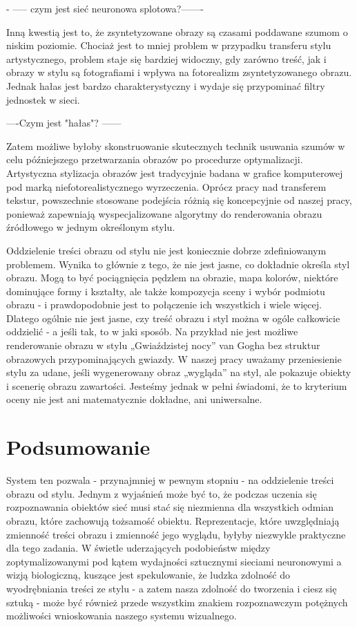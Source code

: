 \documentclass[brudnopis]{xmgr}
\begin{document}
- ----- czym jest sieć neuronowa splotowa?-------

Inną kwestią jest to, że zsyntetyzowane obrazy są czasami poddawane szumom o niskim poziomie. Chociaż jest to mniej problem w przypadku transferu stylu artystycznego, problem staje się bardziej widoczny, gdy zarówno treść, jak i obrazy w stylu są fotografiami i wpływa na fotorealizm zsyntetyzowanego obrazu. Jednak hałas jest bardzo charakterystyczny i wydaje się przypominać filtry jednostek w sieci. 

----Czym jest "hałas"? ------

Zatem możliwe byłoby skonstruowanie skutecznych technik usuwania szumów w celu późniejszego przetwarzania obrazów po procedurze optymalizacji.
Artystyczna stylizacja obrazów jest tradycyjnie badana w grafice komputerowej pod marką niefotorealistycznego wyrzeczenia. Oprócz pracy nad transferem tekstur, powszechnie stosowane podejścia różnią się koncepcyjnie od naszej pracy, ponieważ zapewniają wyspecjalizowane algorytmy do renderowania obrazu źródłowego w jednym określonym stylu. 

Oddzielenie treści obrazu od stylu nie jest koniecznie dobrze zdefiniowanym problemem. Wynika to głównie z tego, że nie jest jasne, co dokładnie określa styl obrazu. Mogą to być pociągnięcia pędzlem na obrazie, mapa kolorów, niektóre dominujące formy i kształty, ale także kompozycja sceny i wybór podmiotu obrazu - i prawdopodobnie jest to połączenie ich wszystkich i wiele więcej. Dlatego ogólnie nie jest jasne, czy treść obrazu i styl można w ogóle całkowicie oddzielić - a jeśli tak, to w jaki sposób. Na przykład nie jest możliwe renderowanie obrazu w stylu „Gwiaździstej nocy” van Gogha bez struktur obrazowych przypominających gwiazdy. W naszej pracy uważamy przeniesienie stylu za udane, jeśli wygenerowany obraz „wygląda” na styl, ale pokazuje obiekty i scenerię obrazu zawartości. Jesteśmy jednak w pełni świadomi, że to kryterium oceny nie jest ani matematycznie dokładne, ani uniwersalne.


\section{Podsumowanie\label{s:dsssl}}

System ten pozwala - przynajmniej w pewnym stopniu - na oddzielenie treści obrazu od stylu. Jednym z wyjaśnień może być to, że podczas uczenia się rozpoznawania obiektów sieć musi stać się niezmienna dla wszystkich odmian obrazu, które zachowują tożsamość obiektu. Reprezentacje, które uwzględniają zmienność treści obrazu i zmienność jego wyglądu, byłyby niezwykle praktyczne dla tego zadania. W świetle uderzających podobieństw między zoptymalizowanymi pod kątem wydajności sztucznymi sieciami neuronowymi a wizją biologiczną, kuszące jest spekulowanie, że ludzka zdolność do wyodrębniania treści ze stylu - a zatem nasza zdolność do tworzenia i ciesz się sztuką - może być również przede wszystkim znakiem rozpoznawczym potężnych możliwości wnioskowania naszego systemu wizualnego.
\end{document}
